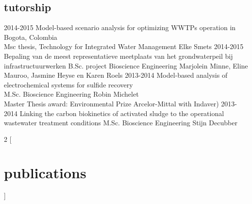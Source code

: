 \documentclass[]{stvhoey-cv}  %
\begin{document}
\subsection*{tutorship}
\begin{entrylist}
  \entry
    {2014-2015}
    {Model-based scenario analysis for optimizing WWTPs operation in Bogota, Colombia\\}
    {Msc thesis, Technology for Integrated Water Management}
    {Elke Smets }
  \entry
    {2014-2015}
    {Bepaling van de meest representatieve meetplaats van het grondwaterpeil bij infrastructuurwerken}
    {B.Sc. project Bioscience Engineering}
    {Marjolein Minne, Eline Mauroo, Jasmine Heyse en Karen Roels}
   \entry
    {2013-2014}
    {Model-based analysis of electrochemical systems for sulfide recovery\\}
    {M.Sc. Bioscience Engineering}
    {Robin Michelet\\ \small{Master Thesis award: Environmental Prize Arcelor-Mittal with Indaver)}}
   \entry
    {2013-2014}
    {Linking the carbon biokinetics of activated sludge to the operational wastewater treatment conditions}
    {M.Sc. Bioscience Engineering}
    {Stijn Decubber}
\end{entrylist}

\begin{multicols}{2}
[
\section{publications}
]

\begin{refsection}
  \nocite{*}
  \printbibliography[sorting=chronological, type=inproceedings, title={peer-reviewed conferences/proceedings}, notkeyword={oral}, notkeyword={poster},heading=subbibliography]
\end{refsection}

\begin{refsection}
  \nocite{*}
  \printbibliography[sorting=chronological, type=inproceedings, title={conference presentations}, keyword={oral}, heading=subbibliography]
\end{refsection}

\begin{refsection}
  \nocite{*}
  \printbibliography[sorting=chronological, type=inproceedings, title={conference posters}, keyword={poster}, heading=subbibliography]
\end{refsection}


\end{multicols}

\end{document}

